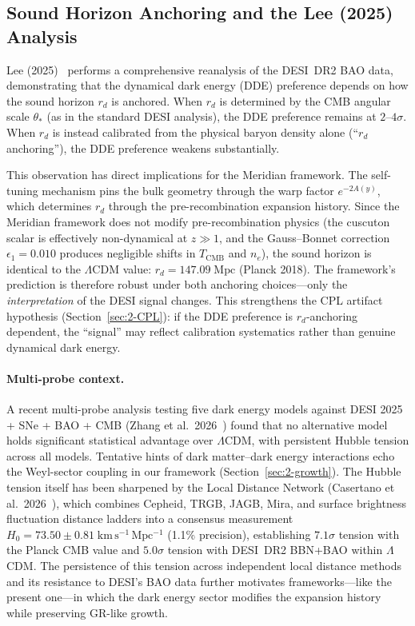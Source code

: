 \subsection{Sound Horizon Anchoring and the Lee (2025) Analysis}
\label{sec:2-lee2025-rd}

Lee (2025)~\cite{ch2:Lee2025} performs a comprehensive reanalysis of the DESI~DR2 BAO data, demonstrating that the dynamical dark energy (DDE) preference depends on how the sound horizon $r_d$ is anchored. When $r_d$ is determined by the CMB angular scale $\theta_*$ (as in the standard DESI analysis), the DDE preference remains at $2$--$4\sigma$. When $r_d$ is instead calibrated from the physical baryon density alone (``$r_d$ anchoring''), the DDE preference weakens substantially.

This observation has direct implications for the Meridian framework. The self-tuning mechanism pins the bulk geometry through the warp factor $e^{-2A(y)}$, which determines $r_d$ through the pre-recombination expansion history. Since the Meridian framework does not modify pre-recombination physics (the cuscuton scalar is effectively non-dynamical at $z \gg 1$, and the Gauss--Bonnet correction $\epsilon_1 = 0.010$ produces negligible shifts in $T_\mathrm{CMB}$ and $n_e$), the sound horizon is identical to the $\Lambda$CDM value: $r_d = 147.09\;\mathrm{Mpc}$ (Planck 2018). The framework's prediction is therefore robust under both anchoring choices---only the \emph{interpretation} of the DESI signal changes. This strengthens the CPL artifact hypothesis (Section~\ref{sec:2-CPL}): if the DDE preference is $r_d$-anchoring dependent, the ``signal'' may reflect calibration systematics rather than genuine dynamical dark energy.

\paragraph{Multi-probe context.}
A recent multi-probe analysis testing five dark energy models against DESI 2025 + SNe + BAO + CMB (Zhang et al.\ 2026~\cite{ch2:Zhang2026}) found that no alternative model holds significant statistical advantage over $\Lambda$CDM, with persistent Hubble tension across all models. Tentative hints of dark matter--dark energy interactions echo the Weyl-sector coupling in our framework (Section~\ref{sec:2-growth}). The Hubble tension itself has been sharpened by the Local Distance Network (Casertano et al.\ 2026~\cite{ch2:H0DN2026}), which combines Cepheid, TRGB, JAGB, Mira, and surface brightness fluctuation distance ladders into a consensus measurement $H_0 = 73.50 \pm 0.81\;\mathrm{km\,s^{-1}\,Mpc^{-1}}$ (1.1\% precision), establishing $7.1\sigma$ tension with the Planck CMB value and $5.0\sigma$ tension with DESI~DR2 BBN+BAO within $\Lambda$CDM. The persistence of this tension across independent local distance methods and its resistance to DESI's BAO data further motivates frameworks---like the present one---in which the dark energy sector modifies the expansion history while preserving GR-like growth.

